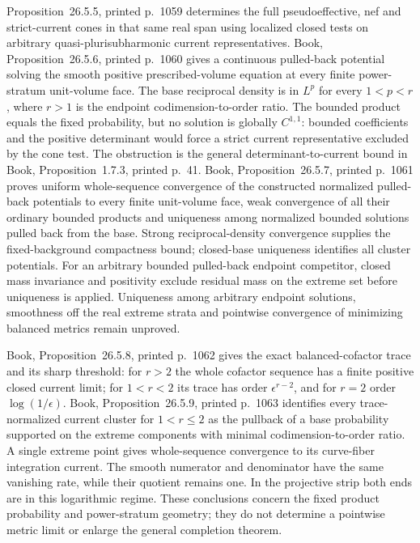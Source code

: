 \documentclass[11pt]{article}
\begin{document}
Proposition~26.5.5, printed p.~1059 determines the full pseudoeffective, nef and strict-current cones in that same real span using localized closed tests on arbitrary quasi-plurisubharmonic current representatives. Book, Proposition~26.5.6, printed p.~1060 gives a continuous pulled-back potential solving the smooth positive prescribed-volume equation at every finite power-stratum unit-volume face. The base reciprocal density is in $L^p$ for every $1<p<r$, where $r>1$ is the endpoint codimension-to-order ratio. The bounded product equals the fixed probability, but no solution is globally $C^{1,1}$: bounded coefficients and the positive determinant would force a strict current representative excluded by the cone test. The obstruction is the general determinant-to-current bound in Book, Proposition~1.7.3, printed p.~41. Book, Proposition~26.5.7, printed p.~1061 proves uniform whole-sequence convergence of the constructed normalized pulled-back potentials to every finite unit-volume face, weak convergence of all their ordinary bounded products and uniqueness among normalized bounded solutions pulled back from the base. Strong reciprocal-density convergence supplies the fixed-background compactness bound; closed-base uniqueness identifies all cluster potentials. For an arbitrary bounded pulled-back endpoint competitor, closed mass invariance and positivity exclude residual mass on the extreme set before uniqueness is applied. Uniqueness among arbitrary endpoint solutions, smoothness off the real extreme strata and pointwise convergence of minimizing balanced metrics remain unproved. \par Book, Proposition~26.5.8, printed p.~1062 gives the exact balanced-cofactor trace and its sharp threshold: for $r>2$ the whole cofactor sequence has a finite positive closed current limit; for $1<r<2$ its trace has order $\epsilon^{r-2}$, and for $r=2$ order $\log(1/\epsilon)$. Book, Proposition~26.5.9, printed p.~1063 identifies every trace-normalized current cluster for $1<r\leq2$ as the pullback of a base probability supported on the extreme components with minimal codimension-to-order ratio. A single extreme point gives whole-sequence convergence to its curve-fiber integration current. The smooth numerator and denominator have the same vanishing rate, while their quotient remains one. In the projective strip both ends are in this logarithmic regime. These conclusions concern the fixed product probability and power-stratum geometry; they do not determine a pointwise metric limit or enlarge the general completion theorem.
\end{document}

